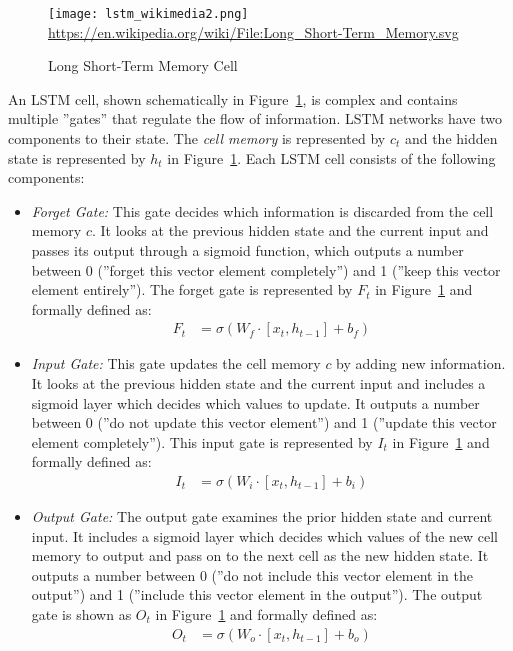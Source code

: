 \begin{figure}
\centering

\texttt{[image: lstm\_wikimedia2.png]}
\scriptsize \url{https://en.wikipedia.org/wiki/File:Long_Short-Term_Memory.svg} \normalsize
\caption{Long Short-Term Memory Cell}
\label{fig:lstm}
\end{figure}

An LSTM cell, shown schematically in Figure~\ref{fig:lstm}, is complex and contains multiple ''gates'' that regulate the flow of information. LSTM networks have two components to their state. The \emph{cell memory} is represented by $c_t$ and the hidden state is represented by $h_t$ in Figure~\ref{fig:lstm}. Each LSTM cell consists of the following components:

\begin{itemize}
\item \emph{Forget Gate:} This gate decides which information is discarded from the cell memory $c$. It looks at the previous hidden state and the current input and passes its output through a sigmoid function, which outputs a number between 0 (''forget this vector element completely'') and 1 (''keep this vector element entirely''). The forget gate is represented by $F_t$ in Figure~\ref{fig:lstm} and formally defined as:
\begin{align}
F_t &= \sigma (W_f \cdot [ x_t, h_{t-1}] + b_f) \label{eq:forget}
\end{align}
\item \emph{Input Gate:} This gate updates the cell memory $c$ by adding new information. It looks at the previous hidden state and the current input and includes a sigmoid layer which decides which values to update. It outputs a number between 0 (''do not update this vector element'') and 1 (''update this vector element completely''). This input gate is represented by $I_t$ in Figure~\ref{fig:lstm} and formally defined as:
\begin{align}
I_t &= \sigma (W_i \cdot [ x_t, h_{t-1}] + b_i) \label{eq:input}
\end{align}
\item \emph{Output Gate:} The output gate examines the prior hidden state and current input. It includes a sigmoid layer which decides which values of the new cell memory to output and pass on to the next cell as the new hidden state. It outputs a number between 0 (''do not include this vector element in the output'') and 1 (''include this vector element in the output''). The output gate is shown as $O_t$ in Figure~\ref{fig:lstm} and formally defined as:
\begin{align}
O_t &= \sigma (W_o \cdot [ x_t, h_{t-1}] + b_o) \label{eq:output}
\end{align}
\end{itemize}

